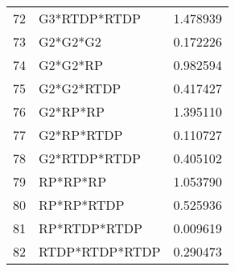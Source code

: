 \begin{tabular}{llr}
72 & G3*RTDP*RTDP & 1.478939 \\
73 & G2*G2*G2 & 0.172226 \\
74 & G2*G2*RP & 0.982594 \\
75 & G2*G2*RTDP & 0.417427 \\
76 & G2*RP*RP & 1.395110 \\
77 & G2*RP*RTDP & 0.110727 \\
78 & G2*RTDP*RTDP & 0.405102 \\
79 & RP*RP*RP & 1.053790 \\
80 & RP*RP*RTDP & 0.525936 \\
81 & RP*RTDP*RTDP & 0.009619 \\
82 & RTDP*RTDP*RTDP & 0.290473 \\
\bottomrule
\end{tabular}
